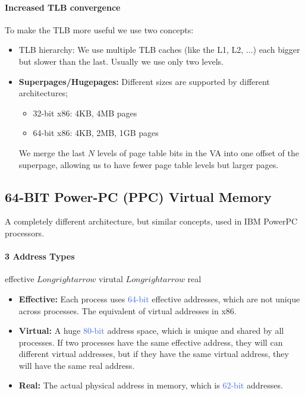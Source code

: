 \documentclass[openany,12pt]{book}
\newcommand{\blue}[1]{\textcolor{RoyalBlue}{#1}}
\begin{document}
\paragraph{Increased TLB convergence} To make the TLB more useful we use two concepts:
\begin{itemize}
  \item TLB hierarchy: We use multiple TLB caches (like the L1, L2, ...) each bigger but slower than the last. Usually we use only two levels.
  
  \item \textbf{Superpages/Hugepages:} Different sizes are supported by different architectures;
  \begin{itemize}
    \item 32-bit x86: 4KB, 4MB pages
    \item 64-bit x86: 4KB, 2MB, 1GB pages
  \end{itemize}
  We merge the last \(N\) levels of page table bits in the VA into one offset of the superpage, allowing us to have fewer page table levels but larger pages.
\end{itemize}


\subsection*{64-BIT Power-PC (PPC) Virtual Memory}

A completely different architecture, but similar concepts, used in IBM PowerPC processors. 


\paragraph{3 Address Types} effective \(Longrightarrow\) virutal \(Longrightarrow\) real
\begin{itemize}
  \item \textbf{Effective:} Each process uses \blue{64-bit} effective addresses, which are not unique across processes. The equivalent of virtual addresses in x86.
  \item \textbf{Virtual:} A huge \blue{80-bit} address space, which is unique and shared by all processes. If two processes have the same effective address, they will can different virtual addresses, but if they have the same virtual address, they will have the same real address.
  \item \textbf{Real:} The actual physical address in memory, which is \blue{62-bit} addresses.
\end{itemize}
\end{document}
